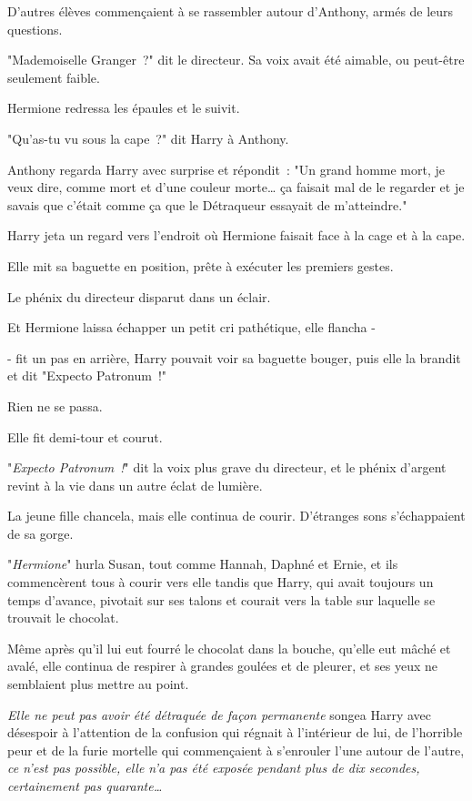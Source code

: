 D'autres élèves commençaient à se rassembler autour d'Anthony, armés de leurs questions.

"Mademoiselle Granger~?" dit le directeur. Sa voix avait été aimable, ou peut-être seulement faible.

Hermione redressa les épaules et le suivit.

"Qu'as-tu vu sous la cape~?" dit Harry à Anthony.

Anthony regarda Harry avec surprise et répondit~: "Un grand homme mort, je veux dire, comme mort et d'une couleur morte… ça faisait mal de le regarder et je savais que c'était comme ça que le Détraqueur essayait de m'atteindre."

Harry jeta un regard vers l'endroit où Hermione faisait face à la cage et à la cape.

Elle mit sa baguette en position, prête à exécuter les premiers gestes.

Le phénix du directeur disparut dans un éclair.

Et Hermione laissa échapper un petit cri pathétique, elle flancha -

- fit un pas en arrière, Harry pouvait voir sa baguette bouger, puis elle la brandit et dit "Expecto Patronum~!"

Rien ne se passa.

Elle fit demi-tour et courut.

"\emph{Expecto Patronum~!}" dit la voix plus grave du directeur, et le phénix d'argent revint à la vie dans un autre éclat de lumière.

La jeune fille chancela, mais elle continua de courir. D'étranges sons s'échappaient de sa gorge.

"\emph{Hermione}" hurla Susan, tout comme Hannah, Daphné et Ernie, et ils commencèrent tous à courir vers elle tandis que Harry, qui avait toujours un temps d'avance, pivotait sur ses talons et courait vers la table sur laquelle se trouvait le chocolat.

Même après qu'il lui eut fourré le chocolat dans la bouche, qu'elle eut mâché et avalé, elle continua de respirer à grandes goulées et de pleurer, et ses yeux ne semblaient plus mettre au point.

\emph{Elle ne peut pas avoir été détraquée de façon permanente} songea Harry avec désespoir à l'attention de la confusion qui régnait à l'intérieur de lui, de l'horrible peur et de la furie mortelle qui commençaient à s'enrouler l'une autour de l'autre, \emph{ce n'est pas possible, elle n'a pas été exposée pendant plus de dix secondes, certainement pas quarante…}

